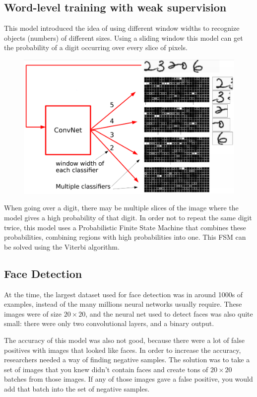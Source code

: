 \subsection{Word-level training with weak supervision}

This model introduced the idea of using different window widths to recognize objects (numbers) of different sizes.
Using a sliding window this model can get the probability of a digit occurring over every slice of pixels.

\begin{figure}[!ht]
\centering
	\includegraphics[width=0.5\linewidth]{lectures/04-a/images/word-level.png}
\label{fig:WordLevel}
\end{figure}

When going over a digit, there may be multiple slices of the image where the model gives a high probability of that digit.
In order not to repeat the same digit twice, this model uses a Probabilistic Finite State Machine that combines these probabilities, 
combining regions with high probabilities into one.
This FSM can be solved using the Viterbi algorithm.

\subsection{Face Detection}

At the time, the largest dataset used for face detection was in around 1000s of examples, instead of the many millions neural networks usually require.
These images were of size $20\times20$, and the neural net used to detect faces was also quite small: there were only two convolutional layers, and a binary output.

The accuracy of this model was also not good, because there were a lot of false positives with images that looked like faces.
In order to increase the accuracy, researchers needed a way of finding negative samples.
The solution was to take a set of images that you knew didn't contain faces and create tons of $20\times20$ batches from those images.
If any of those images gave a false positive, you would add that batch into the set of negative samples.

